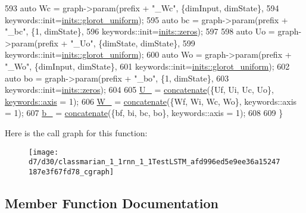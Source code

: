 \begin{DoxyCode}
593     \textcolor{keyword}{auto} Wc = graph->param(prefix + \textcolor{stringliteral}{"\_Wc"}, \{dimInput, dimState\},
594                        keywords::init=\hyperlink{namespacemarian_1_1inits_a8838c47537f434b855491cd3ed97ccd1}{inits::glorot\_uniform});
595     \textcolor{keyword}{auto} bc = graph->param(prefix + \textcolor{stringliteral}{"\_bc"}, \{1, dimState\},
596                        keywords::init=\hyperlink{namespacemarian_1_1inits_a1bd34fd256e3df7bb1e27955a7f2b359}{inits::zeros});
597 
598     \textcolor{keyword}{auto} Uo = graph->param(prefix + \textcolor{stringliteral}{"\_Uo"}, \{dimState, dimState\},
599                        keywords::init=\hyperlink{namespacemarian_1_1inits_a8838c47537f434b855491cd3ed97ccd1}{inits::glorot\_uniform});
600     \textcolor{keyword}{auto} Wo = graph->param(prefix + \textcolor{stringliteral}{"\_Wo"}, \{dimInput, dimState\},
601                        keywords::init=\hyperlink{namespacemarian_1_1inits_a8838c47537f434b855491cd3ed97ccd1}{inits::glorot\_uniform});
602     \textcolor{keyword}{auto} bo = graph->param(prefix + \textcolor{stringliteral}{"\_bo"}, \{1, dimState\},
603                        keywords::init=\hyperlink{namespacemarian_1_1inits_a1bd34fd256e3df7bb1e27955a7f2b359}{inits::zeros});
604 
605     \hyperlink{classmarian_1_1rnn_1_1TestLSTM_aea81b51a3f0af12142e2f805d2dfb98b}{U\_} = \hyperlink{namespacemarian_a2791a2c8f79a938f5cb22ae613680675}{concatenate}(\{Uf, Ui, Uc, Uo\}, \hyperlink{namespacemarian_1_1keywords_ace9158eabbddaca833133f12da98b9d6}{keywords::axis} = 1);
606     \hyperlink{classmarian_1_1rnn_1_1TestLSTM_a42bf53d25a767f033fd0e24309d22c2a}{W\_} = \hyperlink{namespacemarian_a2791a2c8f79a938f5cb22ae613680675}{concatenate}(\{Wf, Wi, Wc, Wo\}, keywords::axis = 1);
607     \hyperlink{classmarian_1_1rnn_1_1TestLSTM_a42841212d517619b37559870c0d65ed1}{b\_} = \hyperlink{namespacemarian_a2791a2c8f79a938f5cb22ae613680675}{concatenate}(\{bf, bi, bc, bo\}, keywords::axis = 1);
608 
609   \}
\end{DoxyCode}


Here is the call graph for this function\+:
\nopagebreak
\begin{figure}[H]
\begin{center}
\leavevmode
\texttt{[image: d7/d30/classmarian\_1\_1rnn\_1\_1TestLSTM\_afd996ed5e9ee36a15247187e3f67fd78\_cgraph]}
\end{center}
\end{figure}




\subsection{Member Function Documentation}
